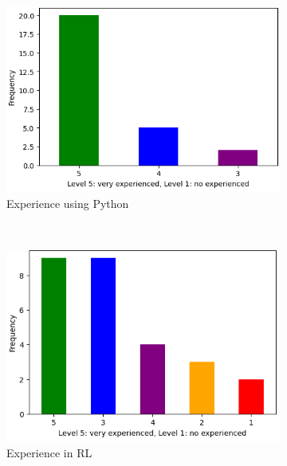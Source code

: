 \begin{figure}[hptb]
    \centering
    \begin{subfigure}[b]{0.45\textwidth}
        \centering
        \includegraphics[width=\textwidth]{figures/experience-python}
        \caption{Experience using Python}
        \label{fig:python-experience}
    \end{subfigure}
    ~ 
    \begin{subfigure}[b]{0.45\textwidth}
        \centering
        \includegraphics[width=\textwidth]{figures/experience-rl}
        \caption{Experience in \ac{RL}}
        \label{fig:rl-experience}
    \end{subfigure}
    ~ 
    \begin{subfigure}[b]{0.45\textwidth}
        \centering

\end{subfigure}
\end{figure}
